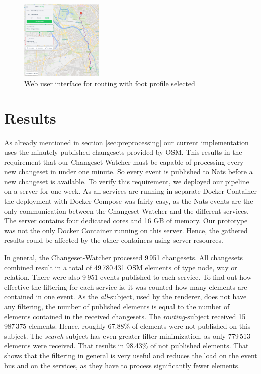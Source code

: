 \documentclass[conference]{IEEEtran}
\begin{document}
\begin{figure}[H]
    \centering
    \includegraphics[width=0.35\textwidth]{figures/routing-2.png}
    \caption{Web user interface for routing with foot profile selected}
    \label{fig:frotend_routing_foot}
\end{figure}

\section{Results}
\label{sec:Results}
As already mentioned in section \ref{sec:preprocessing} our current implementation uses the minutely published changesets provided by OSM. This results in the requirement that our Changeset-Watcher must be capable of processing every new changeset in under one minute. So every event is published to Nats before a new changeset is available. To verify this requirement, we deployed our pipeline on a server for one week. As all services are running in separate Docker Container the deployment with Docker Compose was fairly easy, as the Nats events are the only communication between the Changeset-Watcher and the different services. The server contains four dedicated cores and 16 GB of memory. Our prototype was not the only Docker Container running on this server. Hence, the gathered results could be affected by the other containers using server resources.

In general, the Changeset-Watcher processed 9\,951 changesets. All changesets combined result in a total of  49\,780\,431 OSM elements of type node, way or relation. There were also 9\,951 events published to each service. To find out how effective the filtering for each service is, it was counted how many elements are contained in one event. As the \textit{all}-subject, used by the renderer, does not have any filtering, the number of published elements is equal to the number of elements contained in the received changesets. The \textit{routing}-subject received 15\,987\,375 elements. Hence, roughly 67.88\% of elements were not published on this subject. The \textit{search}-subject has even greater filter minimization, as only 779\,513 elements were received. That results in 98.43\% of not published elements. That shows that the filtering in general is very useful and reduces the load on the event bus and on the services, as they have to process significantly fewer elements.
\end{document}
